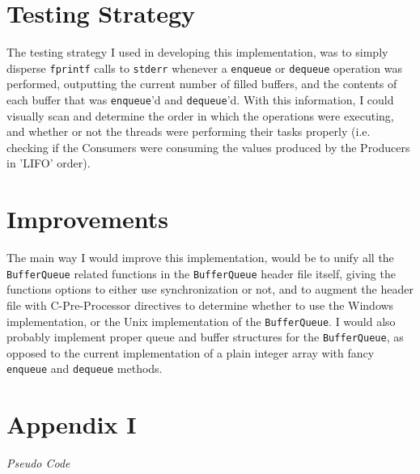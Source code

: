 \documentclass[12pt]{article}
\newcommand {\append}[2] {\section*{Appendix #1} \textsl{\large #2}}
\begin{document}
\section*{Testing Strategy}
The testing strategy I used in developing this implementation, was to simply disperse \texttt{fprintf} calls to \texttt{stderr} whenever a \texttt{enqueue} or
\texttt{dequeue} operation was performed, outputting the current number of filled buffers, and the contents of each buffer that was \texttt{enqueue}'d and 
\texttt{dequeue}'d. With this information, I could visually scan and determine the order in which the operations were executing, and whether or not the threads 
were performing their tasks properly (i.e. checking if the Consumers were consuming the values produced by the Producers in 'LIFO' order).


\section*{Improvements}
The main way I would improve this implementation, would be to unify all the \texttt{BufferQueue} related functions in the \texttt{BufferQueue} header file itself,
giving the functions options to either use synchronization or not, and to augment the header file with C-Pre-Processor directives to determine whether to use the 
Windows implementation, or the Unix implementation of the \texttt{BufferQueue}.  I would also probably implement proper queue and buffer structures for the 
\texttt{BufferQueue}, as opposed to the current implementation of a plain integer array with fancy \texttt{enqueue} and \texttt{dequeue} methods.


\newpage
\append{I} {Pseudo Code}
\end{document}
